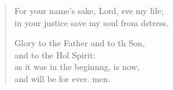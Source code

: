 \begin{verse}
\begin{patverse}
    For your name’s sake, Lord, sve my life;\Med\\
    in your justice save my soul from d\pointup{\i}stress.

    Glory to the Father and to th Son,\Med\\
    and to the Hol Spirit:\\
    as it was in the beginn\pointup{\i}ng, is now,\Med\\
    and will be for ever. men.
  \end{patverse}
  \end{verse}
